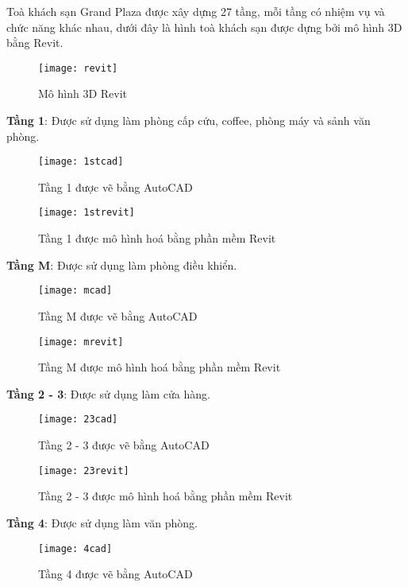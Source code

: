 Toà khách sạn Grand Plaza được xây dựng 27 tầng, mỗi tầng có nhiệm vụ và chức năng khác nhau, dưới đây là hình toà khách sạn được dựng bởi mô hình 3D bằng Revit.

\begin{figure}[H]
	\centering
	\texttt{[image: revit]}
	\caption{Mô hình 3D Revit}
	\label{revit}
\end{figure}

\newpage
\textbf{Tầng 1}: Được sử dụng làm phòng cấp cứu, coffee, phòng máy và sảnh văn phòng.

\begin{figure}[H]
	\centering
	\texttt{[image: 1stcad]}
	\caption{Tầng 1 được vẽ bằng AutoCAD}
	\label{1stcad}
\end{figure}

\begin{figure}[H]
	\centering
	\texttt{[image: 1strevit]}
	\caption{Tầng 1 được mô hình hoá bằng phần mềm Revit}
	\label{1strevit}
\end{figure}

\newpage
\textbf{Tầng M}: Được sử dụng làm phòng điều khiển.

\begin{figure}[H]
	\centering
	\texttt{[image: mcad]}
	\caption{Tầng M được vẽ bằng AutoCAD}
	\label{mcad}
\end{figure}

\begin{figure}[H]
	\centering
	\texttt{[image: mrevit]}
	\caption{Tầng M được mô hình hoá bằng phần mềm Revit}
	\label{mrevit}
\end{figure} 

\newpage
\textbf{Tầng 2 - 3}: Được sử dụng làm cửa hàng.

\begin{figure}[H]
	\centering
	\texttt{[image: 23cad]}
	\caption{Tầng 2 - 3 được vẽ bằng AutoCAD}
	\label{23cad}
\end{figure}

\begin{figure}[H]
	\centering
	\texttt{[image: 23revit]}
	\caption{Tầng 2 - 3 được mô hình hoá bằng phần mềm Revit}
	\label{23revit}
\end{figure} 

\newpage
\textbf{Tầng 4}: Được sử dụng làm văn phòng.

\begin{figure}[H]
	\centering
	\texttt{[image: 4cad]}
	\caption{Tầng 4 được vẽ bằng AutoCAD}
	\label{4cad}
\end{figure}

